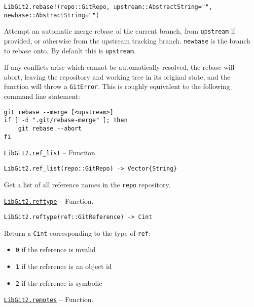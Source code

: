 \begin{adjustwidth}{2em}{0pt}


\begin{verbatim}
LibGit2.rebase!(repo::GitRepo, upstream::AbstractString="", newbase::AbstractString="")
\end{verbatim}

Attempt an automatic merge rebase of the current branch, from \texttt{upstream} if provided, or otherwise from the upstream tracking branch. \texttt{newbase} is the branch to rebase onto. By default this is \texttt{upstream}.

If any conflicts arise which cannot be automatically resolved, the rebase will abort, leaving the repository and working tree in its original state, and the function will throw a \texttt{GitError}. This is roughly equivalent to the following command line statement:


\begin{lstlisting}
git rebase --merge [<upstream>]
if [ -d ".git/rebase-merge" ]; then
    git rebase --abort
fi
\end{lstlisting}



\end{adjustwidth}
\hypertarget{12847926185465464483}{}
\hyperlink{12847926185465464483}{\texttt{LibGit2.ref\_list}}  -- {Function.}

\begin{adjustwidth}{2em}{0pt}


\begin{verbatim}
LibGit2.ref_list(repo::GitRepo) -> Vector{String}
\end{verbatim}

Get a list of all reference names in the \texttt{repo} repository.



\end{adjustwidth}
\hypertarget{5156390520855755168}{}
\hyperlink{5156390520855755168}{\texttt{LibGit2.reftype}}  -- {Function.}

\begin{adjustwidth}{2em}{0pt}


\begin{verbatim}
LibGit2.reftype(ref::GitReference) -> Cint
\end{verbatim}

Return a \texttt{Cint} corresponding to the type of \texttt{ref}:

\begin{itemize}
\item \texttt{0} if the reference is invalid


\item \texttt{1} if the reference is an object id


\item \texttt{2} if the reference is symbolic

\end{itemize}


\end{adjustwidth}
\hypertarget{5507389887346241045}{}
\hyperlink{5507389887346241045}{\texttt{LibGit2.remotes}}  -- {Function.}

